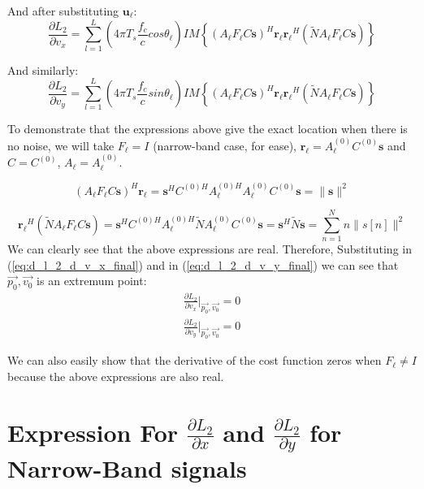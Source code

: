 \documentclass[10pt,a4paper]{report}
\begin{document}
And after substituting $\mathbf{u_\ell}$:
\begin{equation}
\label{eq:d_l_2_d_v_x_final}
\frac{\partial L_2}{\partial v_x} = \sum_{l=1}^L (4 \pi T_s\frac{f_c}{c} cos\theta_\ell) IM
\left\{
(A_\ell F_\ell C \mathbf{s})^H \mathbf{r_\ell}\mathbf{r_\ell}^H (\tilde{N}A_\ell F_\ell C \mathbf{s})
\right\}
\end{equation}

And similarly:
\begin{equation}
\label{eq:d_l_2_d_v_y_final}
\frac{\partial L_2}{\partial v_y} = \sum_{l=1}^L (4 \pi T_s\frac{f_c}{c} sin\theta_\ell) IM
\left\{
(A_\ell F_\ell C \mathbf{s})^H \mathbf{r_\ell}\mathbf{r_\ell}^H (\tilde{N}A_\ell F_\ell C \mathbf{s})
\right\}
\end{equation}

To demonstrate that the expressions above give the exact location when there is no noise,
we will take $F_\ell=I$ (narrow-band case, for ease), $\mathbf{r_\ell} = A_\ell^{(0)} C^{(0)} \mathbf{s}$
and $C=C^{(0)}$, $A_\ell = A_\ell^{(0)}$.


\begin{equation}
(A_\ell F_\ell C \mathbf{s})^H \mathbf{r_\ell} = \mathbf{s}^H C^{(0)H} A_\ell^{(0)H} A_\ell^{(0)} C^{(0)} \mathbf{s} = 
\|\mathbf{s}\|^2
\end{equation}

\begin{equation}
\mathbf{r_\ell}^H (\tilde{N}A_\ell F_\ell C \mathbf{s}) = 
\mathbf{s}^H C^{(0)H} A_\ell^{(0)H} \tilde{N} A_\ell^{(0)} C^{(0)} \mathbf{s} = 
\mathbf{s}^H  \tilde{N} \mathbf{s} = \sum_{n=1}^Nn\|s[n]\|^2
\end{equation}
We can clearly see that the above expressions are real. Therefore, Substituting in (\ref{eq:d_l_2_d_v_x_final}) and in (\ref{eq:d_l_2_d_v_y_final}) we can see that $\vec{p_0},\vec{v_0}$
is an extremum point:
\begin{eqnarray}
\frac{\partial L_2}{\partial v_x}|_{\vec{p_0},\vec{v_0}} = 0 \\
\frac{\partial L_2}{\partial v_y}|_{\vec{p_0},\vec{v_0}}= 0 \nonumber
\end{eqnarray}

We can also easily show that the derivative of the cost function zeros when $F_\ell \neq I$ because the
above expressions are also real.

\section{Expression For $\frac{\partial L_2}{\partial x}$ and $\frac{\partial L_2}{\partial y}$ for Narrow-Band signals}
\label{d_L2_dx_d_y_NB}
\end{document}
